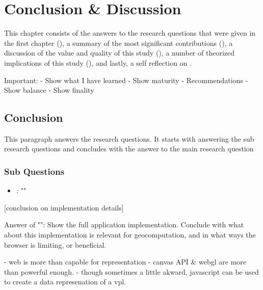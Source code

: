 \chapter{Conclusion \& Discussion}
\label{chap:conclusion}

This chapter consists of the answers to the research
questions that were given in the first chapter (), 
a summary of the most significant contributions (), 
a discussion of the value and quality of this study (),
a number of theorized implications of this study (),
and lastly, a self reflection on .

\begin{note}
  Important: 
  - Show what I have learned
  - Show maturity
  - Recommendations 
  - Show balance
  - Show finality
\end{note}


\section{Conclusion}
\label{sec:conclusion}

This paragraph answers the research questions. 
It starts with answering the sub research questions and concludes with the answer to the main research question

\subsection*{Sub Questions}

\begin{itemize}[ ]
  \item \emph{\mySubRQOneTitle:} "\mySubRQOne"
\end{itemize}

[conclusion on implementation details]

Answer of "\mySubRQOneTitle": Show the full application implementation. Conclude with what about this implementation is relevant for geocomputation, and in what ways the browser is limiting, or beneficial.  

- web is more than capable for representation
  - canvas API \& webgl are more than powerful enough. 
  - though sometimes a little akward, javascript can be used to create a data represenation of a vpl. 
   
